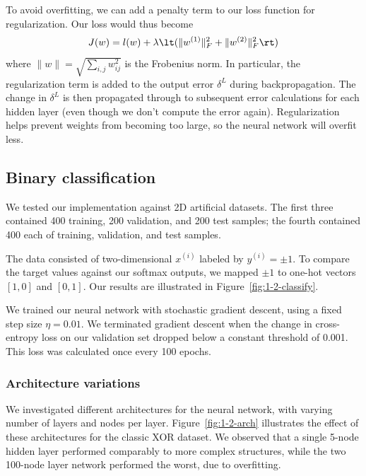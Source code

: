 \documentclass{article}
\newcommand{\sind}[1]{^{(#1)}}
\begin{document}
\begin{multicols}{2}
To avoid overfitting, we can add a penalty term to our loss function for regularization.
Our loss would thus become
\begin{equation}
    J(w) = l(w) +
      \lambda
        \lt(\lVert w^{(1)} \rVert^2_F + \lVert w^{(2)} \rVert^2_F\rt)
\end{equation}
where $\lVert w\rVert = \sqrt{\sum_{i,j}{w_{ij}^2}}$ is the Frobenius norm.
In particular, the regularization term is added to the output error $\delta^L$
during backpropagation. The change in $\delta^L$ is then propagated
through to subsequent error calculations for each hidden layer
(even though we don't compute the error again).
Regularization helps prevent weights from becoming too large,
so the neural network will overfit less.

\subsection{Binary classification}
\label{subsubsec:binary}

We tested our implementation against 2D artificial datasets.
The first three contained
400 training,
200 validation,
and 200 test samples;
the fourth contained
400 each of training, validation, and test samples.

The data consisted of two-dimensional $x\sind{i}$
labeled by $y\sind{i} = \pm1$.
To compare the target values against our softmax outputs,
we mapped $\pm1$ to one-hot vectors $[1,0]$ and $[0,1]$.
Our results are illustrated in Figure~\ref{fig:1-2-classify}.

We trained our neural network with stochastic gradient descent,
using a fixed step size $\eta = 0.01$.
We terminated gradient descent when
the change in cross-entropy loss on our validation set
dropped below a constant threshold of 0.001.
This loss was calculated once every 100 epochs.

\subsubsection{Architecture variations}
\label{subsubsec:binaryarch}

We investigated different architectures for the neural network,
with varying number of layers and nodes per layer.
Figure~\ref{fig:1-2-arch} illustrates the effect
of these architectures for the classic XOR dataset.
We observed that a single 5-node hidden layer
performed comparably to more complex structures,
while the two 100-node layer network performed the worst, due to overfitting.


\end{multicols}
\end{document}
